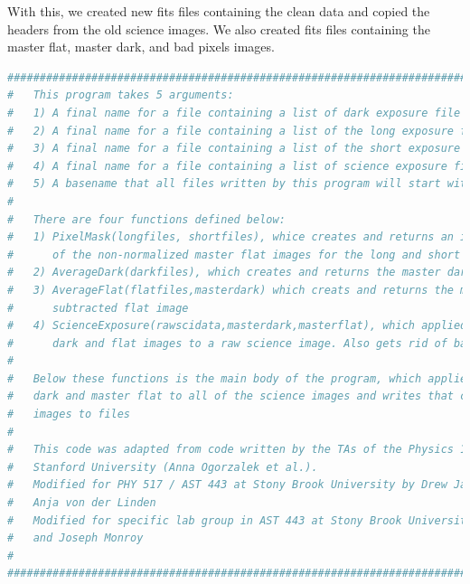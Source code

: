 \documentclass{aastex61}
\begin{document}
With this, we created new fits files containing the clean data and copied the headers from the old science images. We also created fits files containing the master flat, master dark, and bad pixels images.
\begin{lstlisting}[language=Python, caption= Cleans science images (YM)]
##########################################################################################
#   This program takes 5 arguments:                                                      #
#   1) A final name for a file containing a list of dark exposure file names             #
#   2) A final name for a file containing a list of the long exposure flats file names   #
#   3) A final name for a file containing a list of the short exposure flats file names  #
#   4) A final name for a file containing a list of science exposure file names          #
#   5) A basename that all files written by this program will start with                 #
#                                                                                        #
#   There are four functions defined below:                                              #
#   1) PixelMask(longfiles, shortfiles), whice creates and returns an image of the ratio #
#      of the non-normalized master flat images for the long and short exposures         #
#   2) AverageDark(darkfiles), which creates and returns the master dark image           #
#   3) AverageFlat(flatfiles,masterdark) which creats and returns the master dark        #
#      subtracted flat image                                                             #
#   4) ScienceExposure(rawscidata,masterdark,masterflat), which applied the master       #
#      dark and flat images to a raw science image. Also gets rid of bad pixels          #
#                                                                                        #
#   Below these functions is the main body of the program, which applies the master      #
#   dark and master flat to all of the science images and writes that clean science      #
#   images to files                                                                      #
#                                                                                        #
#   This code was adapted from code written by the TAs of the Physics 100 course at      #
#   Stanford University (Anna Ogorzalek et al.).                                         #
#   Modified for PHY 517 / AST 443 at Stony Brook University by Drew Jamieson and        #
#   Anja von der Linden                                                                  #
#   Modified for specific lab group in AST 443 at Stony Brook University by Yogesh Mehta # 
#   and Joseph Monroy                                                                    #
#                                                                                        #
##########################################################################################


\end{lstlisting}
\end{document}
